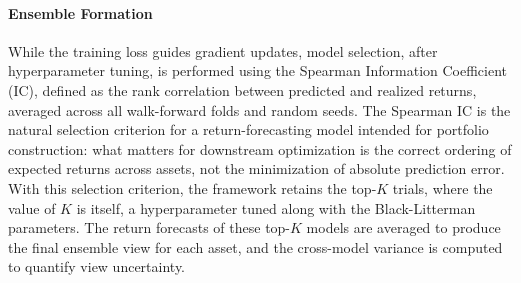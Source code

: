 \paragraph{Ensemble Formation} While the training loss guides gradient updates, model selection, after hyperparameter tuning, is performed using the Spearman Information Coefficient (IC), defined as the rank correlation between predicted and realized returns, averaged across all walk-forward folds and random seeds. The Spearman IC is the natural selection criterion for a return-forecasting model intended for portfolio construction: what matters for downstream optimization is the correct ordering of expected returns across assets, not the minimization of absolute prediction error. With this selection criterion, the framework retains the top-$K$ trials, where the value of $K$ is itself, a hyperparameter tuned along with the Black-Litterman parameters. The return forecasts of these top-$K$ models are averaged to produce the final ensemble view for each asset, and the cross-model variance is computed to quantify view uncertainty.

